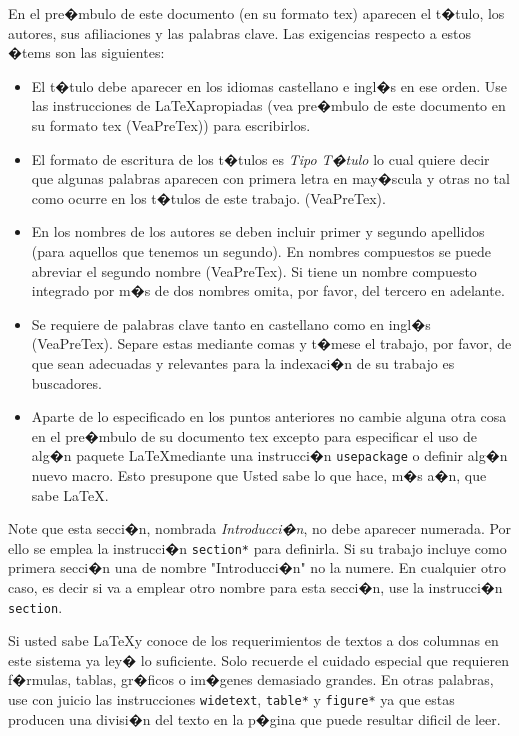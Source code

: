 \documentclass[10pt,twoside]{rcmart} %
\begin{document}
En el pre�mbulo de este documento (en su formato tex) aparecen el t�tulo, los autores, sus afiliaciones y las palabras clave. Las exigencias respecto a estos �tems son las siguientes:
\begin{itemize}
	\item El t�tulo debe aparecer en los idiomas castellano e ingl�s en ese orden. Use las instrucciones de \LaTeX apropiadas (vea pre�mbulo de este documento en su formato tex (VeaPreTex)) para escribirlos.
	\item El formato de escritura de los t�tulos es \emph{Tipo T�tulo} lo cual quiere decir que algunas palabras aparecen con primera letra en may�scula y otras no tal como ocurre en los t�tulos de este trabajo. (VeaPreTex).
	\item En los nombres de los autores se deben incluir primer y segundo apellidos (para aquellos que tenemos un segundo). En nombres compuestos se puede abreviar el segundo nombre (VeaPreTex). Si tiene un nombre compuesto integrado por m�s de dos nombres omita, por favor, del tercero en adelante.
	\item Se requiere de palabras clave tanto en castellano como en ingl�s (VeaPreTex). Separe estas mediante comas y t�mese el trabajo, por favor, de que sean adecuadas y relevantes para la indexaci�n de su trabajo es buscadores.
	\item Aparte de lo especificado en los puntos anteriores no cambie alguna otra cosa en el pre�mbulo de su documento tex excepto para especificar el uso de alg�n paquete \LaTeX mediante una instrucci�n \texttt{usepackage} o definir alg�n nuevo macro. Esto presupone que Usted sabe lo que hace, m�s a�n, que sabe \LaTeX. 
\end{itemize}

Note que esta secci�n, nombrada \emph{Introducci�n}, no debe aparecer numerada. Por ello se emplea la instrucci�n \texttt{section*} para definirla. Si su trabajo incluye como primera secci�n una de nombre "Introducci�n" no la numere. En cualquier otro caso, es decir si va a emplear otro nombre para esta secci�n, use la instrucci�n \texttt{section}.

Si usted sabe \LaTeX y conoce de los requerimientos de textos a dos columnas en este sistema ya ley� lo suficiente. Solo recuerde el cuidado especial que requieren f�rmulas, tablas, gr�ficos o im�genes demasiado grandes. En otras palabras, use con juicio las instrucciones \texttt{widetext}, \texttt{table*} y \texttt{figure*} ya que estas producen una divisi�n del texto en la p�gina que puede resultar dificil de leer.
\end{document}
